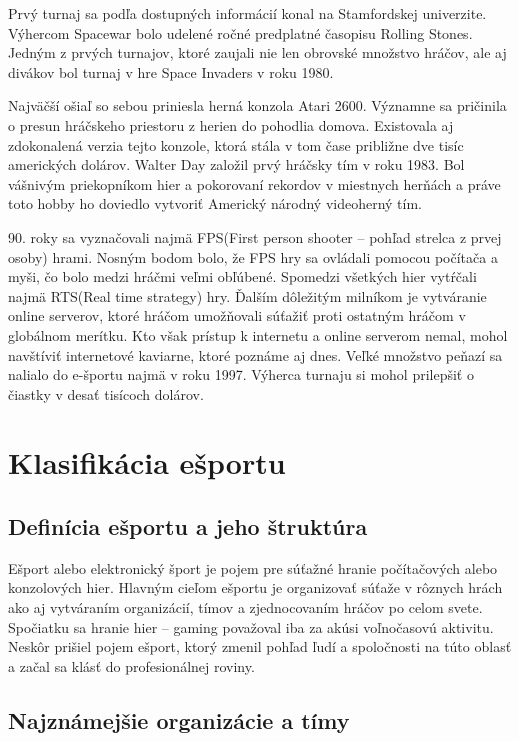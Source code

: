 \documentclass[10pt,oneside,slovak,a4paper]{article}
\begin{document}
Prvý turnaj sa podľa dostupných informácií konal na Stamfordskej univerzite. Výhercom Spacewar bolo udelené ročné predplatné časopisu Rolling Stones. Jedným z prvých turnajov, ktoré zaujali nie len obrovské množstvo hráčov, ale aj divákov bol turnaj v hre Space Invaders v roku 1980.

Najväčší ošiaľ so sebou priniesla herná konzola Atari 2600. Významne sa pričinila o presun hráčskeho priestoru z herien do pohodlia domova. Existovala aj zdokonalená verzia tejto konzole, ktorá stála v tom čase približne dve tisíc amerických dolárov. Walter Day založil prvý hráčsky tím v roku 1983. Bol vášnivým priekopníkom hier a pokorovaní rekordov v miestnych herňách a práve toto hobby ho doviedlo vytvoriť Americký národný videoherný tím.  

90. roky sa vyznačovali najmä FPS(First person shooter – pohľad strelca z prvej osoby) hrami. Nosným bodom bolo, že FPS hry sa ovládali pomocou počítača a myši, čo bolo medzi hráčmi veľmi obľúbené. Spomedzi všetkých hier vytŕčali najmä RTS(Real time strategy) hry. Ďalším dôležitým milníkom je vytváranie online serverov, ktoré hráčom umožňovali súťažiť proti ostatným hráčom v globálnom merítku. Kto však prístup k internetu a online serverom nemal, mohol navštíviť internetové kaviarne, ktoré poznáme aj dnes. Veľké množstvo peňazí sa nalialo do e-športu najmä v roku 1997. Výherca turnaju si mohol prilepšiť o čiastky v desať tisícoch dolárov. \cite{a1}


\section{Klasifikácia ešportu} \label{klasifikacia}

\subsection{Definícia ešportu a jeho štruktúra} \label{klasifikacia:definicia}

Ešport alebo elektronický šport je pojem pre súťažné hranie počítačových alebo konzolových hier. Hlavným cieľom ešportu je organizovať súťaže v rôznych hrách ako aj vytváraním organizácií, tímov a zjednocovaním hráčov po celom svete. Spočiatku sa hranie hier – gaming považoval iba za akúsi voľnočasovú aktivitu. Neskôr prišiel pojem ešport, ktorý zmenil pohľad ľudí a spoločnosti na túto oblasť a začal sa klásť do profesionálnej roviny.\cite{a3}

\subsection{Najznámejšie organizácie a tímy} \label{klasifikacia:organizacie}
\end{document}

